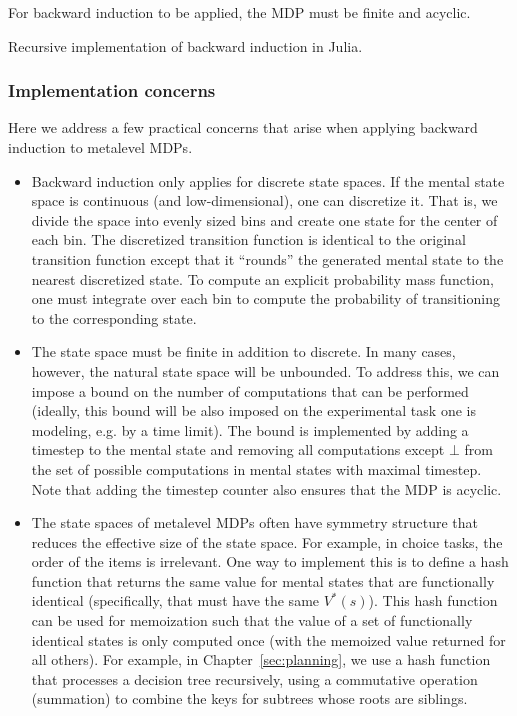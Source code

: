 For backward induction to be applied, the MDP must be finite and acyclic. 

\begin{listing}[tb!]
\caption{Recursive implementation of backward induction in Julia.}
\label{listing:backinduct}
\end{listing}

\subsubsection{Implementation concerns}

Here we address a few practical concerns that arise when applying backward induction to metalevel MDPs.

\begin{itemize}
  \item Backward induction only applies for discrete state spaces. If the mental state space is continuous (and low-dimensional), one can discretize it. That is, we divide the space into evenly sized bins and create one state for the center of each bin. The discretized transition function is identical to the original transition function except that it ``rounds'' the generated mental state to the nearest discretized state. To compute an explicit probability mass function, one must integrate over each bin to compute the probability of transitioning to the corresponding state.
  \item The state space must be finite in addition to discrete. In many cases, however, the natural state space will be unbounded. To address this, we can impose a bound on the number of computations that can be performed (ideally, this bound will be also imposed on the experimental task one is modeling, e.g. by a time limit). The bound is implemented by adding a timestep to the mental state and removing all computations except $\bot$ from the set of possible computations in mental states with maximal timestep. Note that adding the timestep counter also ensures that the MDP is acyclic.
  \item The state spaces of metalevel MDPs often have symmetry structure that reduces the effective size of the state space. For example, in choice tasks, the order of the items is irrelevant. One way to implement this is to define a hash function that returns the same value for mental states that are functionally identical (specifically, that must have the same $V^*(s)$). This hash function can be used for memoization such that the value of a set of functionally identical states is only computed once (with the memoized value returned for all others). For example, in Chapter~\ref{sec:planning}, we use a hash function that processes a decision tree recursively, using a commutative operation (summation) to combine the keys for subtrees whose roots are siblings.

\end{itemize}
